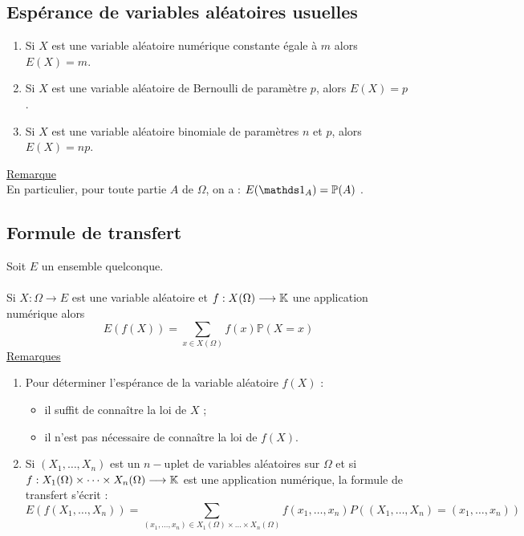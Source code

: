 \subsection{Espérance de variables aléatoires usuelles}
\begin{defprop}
    \begin{enumerate}
        \item Si \(X\) est une variable aléatoire numérique constante égale à \(m\) alors \(E(X) = m\).
        \item Si \(X\) est une variable aléatoire de Bernoulli de paramètre \(p\), alors \(E(X) = p\).
        \item Si \(X\) est une variable aléatoire binomiale de paramètres \(n\) et \(p\), alors \(E(X) = np\).
    \end{enumerate}
    \underline{Remarque}\\
    En particulier, pour toute partie \(A\) de \(\Omega\), on a : \(E(\ind{A}) = \mathbb{P}(A)\) .
\end{defprop}
\subsection{Formule de transfert}
\begin{defprop}
    Soit \(E\) un ensemble quelconque.\\~\\
    Si \(X : \Omega \to E\) est une variable aléatoire et \(f : X(\Omega) \longrightarrow \mathbb{K}\) une application numérique alors
    \[E(f (X)) = \sum_{x\in X(\Omega)}f (x)\mathbb{P}(X = x)\]
    \underline{Remarques}\\
    \begin{enumerate}
        \item Pour déterminer l’espérance de la variable aléatoire \(f (X)\) :
        \begin{itemize}
            \item il suffit de connaître la loi de \(X\) ;
            \item il n’est pas nécessaire de connaître la loi de \(f (X)\).
        \end{itemize}
        \item Si \((X_1, \dots , X_n)\) est un \(n-\)uplet de variables aléatoires sur \(\Omega\) et si \(f : X_1(\Omega) \times \dots \times X_n(\Omega) \longrightarrow \mathbb{K}\) est une application numérique, la formule de transfert s’écrit :
        \[E(f (X_1, \dots , X_n)) = \sum_{(x_1,\dots,x_n)\in X_1(\Omega)\times\dots\times X_n(\Omega)} f (x_1, \dots , x_n)P ((X_1, \dots , X_n) = (x_1, \dots , x_n))\]
    \end{enumerate}
\end{defprop}
